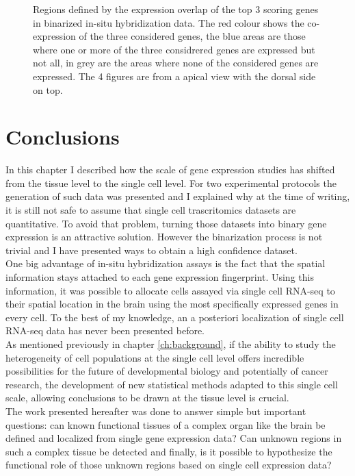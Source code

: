 \begin{figure}[h]
        \caption{Regions defined by the expression overlap of the top 3 scoring genes in \cite{Tomer10} binarized in-situ hybridization data. The red colour shows the co-expression of the three considered genes, the blue areas are those where one or more of the three considrered genes are expressed but not all, in grey are the areas where none of the considered genes are expressed. The 4 figures are from a apical view with the dorsal side on top.}\label{fig:cell_localization}
\end{figure}


\section{Conclusions}
In this chapter I described how the scale of gene expression studies has shifted from the tissue level to the single cell level. For two experimental protocols the generation of such data was presented and I explained why at the time of writing, it is still not safe to assume that single cell trascritomics datasets are quantitative. To avoid that problem, turning those datasets into binary gene expression is an attractive solution. However the binarization process is not trivial and I have presented ways to obtain a high confidence dataset.\\

One big advantage of in-situ hybridization assays is the fact that the spatial information stays attached to each gene expression fingerprint. Using this information, it was possible to allocate cells assayed via single cell RNA-seq to their spatial location in the brain using the most specifically expressed genes in every cell. To the best of my knowledge, an a posteriori localization of single cell RNA-seq data has never been presented before.\\

As mentioned previously in chapter \ref{ch:background}, if the ability to study the heterogeneity of cell populations at the single cell level offers incredible possibilities for the future of developmental biology and potentially of cancer research, the development of new statistical methods adapted to this single cell scale, allowing conclusions to be drawn at the tissue level is crucial.\\

The work presented hereafter was done to answer simple but important questions: can known functional tissues of a complex organ like the brain be defined and localized from single gene expression data? Can unknown regions in such a complex tissue be detected and finally, is it possible to hypothesize the functional role of those unknown regions based on single cell expression data?


	
	



